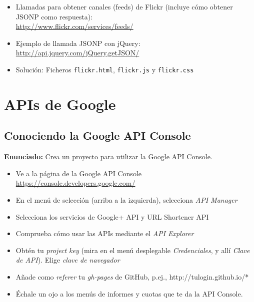 \begin{itemize}
\item Llamadas para obtener canales (feeds) de Flickr (incluye cómo obtener JSONP como respuesta): \\
  \url{http://www.flickr.com/services/feeds/}
\item Ejemplo de llamada JSONP con jQuery: \\
  \url{http://api.jquery.com/jQuery.getJSON/}
\item Solución: Ficheros \verb|flickr.html|, \verb|flickr.js| y \verb|flickr.css|
\end{itemize}



\section{APIs de Google}

\subsection{Conociendo la Google API Console}
\label{subsec:conociendo-google-api-console}

\textbf{Enunciado:} Crea un proyecto para utilizar la Google API Console.

\begin{itemize}
  \item Ve a la página de la Google API Console \url{https://console.developers.google.com/}
  \item En el menú de selección (arriba a la izquierda), selecciona \emph{API Manager}
  \item Selecciona los servicios de Google+ API y URL Shortener API
  \item Comprueba cómo usar las APIs mediante el \emph{API Explorer}
  \item Obtén tu \emph{project key} (mira en el menú desplegable \emph{Credenciales}, y allí \emph{Clave de API}). Elige \emph{clave de navegador} 
  \item Añade como \emph{referer} tu \emph{gh-pages} de GitHub, p.ej., http://tulogin.github.io/*
  \item Échale un ojo a los menús de informes y cuotas que te da la API Console.
\end{itemize}

